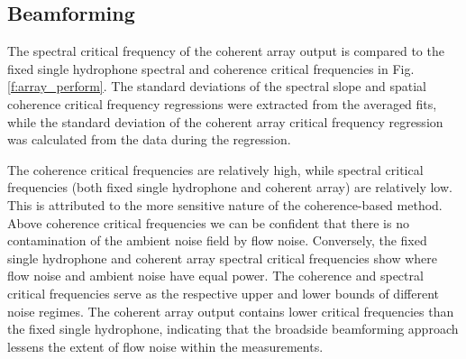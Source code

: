 \documentclass[12pt,journal,onecolumn]{IEEEtran}
\begin{document}
\subsection{Beamforming}
The spectral critical frequency of the coherent array output is compared to the fixed single hydrophone spectral and coherence critical frequencies in Fig. \ref{f:array_perform}. 
The standard deviations of the spectral slope and spatial coherence critical frequency regressions were extracted from the averaged fits, while the standard deviation of the coherent array critical frequency regression was calculated from the data during the regression.

The coherence critical frequencies are relatively high, while spectral critical frequencies (both fixed single hydrophone and coherent array) are relatively low. This is attributed to the more sensitive nature of the coherence-based method. Above coherence critical frequencies we can be confident that there is no contamination of the ambient noise field by flow noise. Conversely, the fixed single hydrophone and coherent array spectral critical frequencies show where flow noise and ambient noise have equal power. The coherence and spectral critical frequencies serve as the respective upper and lower bounds of different noise regimes. The coherent array output contains lower critical frequencies than the fixed single hydrophone, indicating that the broadside beamforming approach lessens the extent of flow noise within the measurements. 
\end{document}
